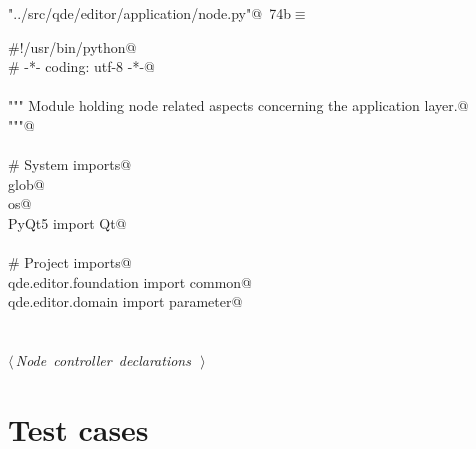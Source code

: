 \documentclass[
    a4paper,      %
    10pt,         %
    openright,    %
    notitlepage,  %
    parskip=half, %
]{scrreprt}       %
\theoremstyle{definition}                    %
\begin{document}
\begin{flushleft} \small
\begin{minipage}{\linewidth}\label{scrap128}\raggedright\small
{} \verb@"../src/qde/editor/application/node.py"@\nobreak\ {\footnotesize {74b}}$\equiv$
\vspace{-1ex}
\begin{list}{}{} \item
\mbox{}\lstinline@#!/usr/bin/python@\\
\mbox{}\lstinline@# -*- coding: utf-8 -*-@\\
\mbox{}\lstinline@@\\
\mbox{}\lstinline@""" Module holding node related aspects concerning the application layer.@\\
\mbox{}\lstinline@"""@\\
\mbox{}\lstinline@@\\
\mbox{}\lstinline@# System imports@\\
\mbox{}\lstinline@import glob@\\
\mbox{}\lstinline@import os@\\
\mbox{}\lstinline@from PyQt5 import Qt@\\
\mbox{}\lstinline@@\\
\mbox{}\lstinline@# Project imports@\\
\mbox{}\lstinline@from qde.editor.foundation import common@\\
\mbox{}\lstinline@from qde.editor.domain import parameter@\\
\mbox{}\lstinline@@\\
\mbox{}\lstinline@@\\
\mbox{}\lstinline@@\hbox{$\langle\,${\itshape Node controller declarations}\nobreak\ {\footnotesize {}}$\,\rangle$}\lstinline@@\\
\mbox{}\lstinline@@{\NWsep}
\end{list}
\vspace{-1.5ex}
\footnotesize
\begin{list}{}{\setlength{\itemsep}{-\parsep}\setlength{\itemindent}{-\leftmargin}}

\item{}
\end{list}
\end{minipage}\vspace{4ex}
\end{flushleft}
\section{Test cases}
\label{sec:test-cases}
\end{document}
